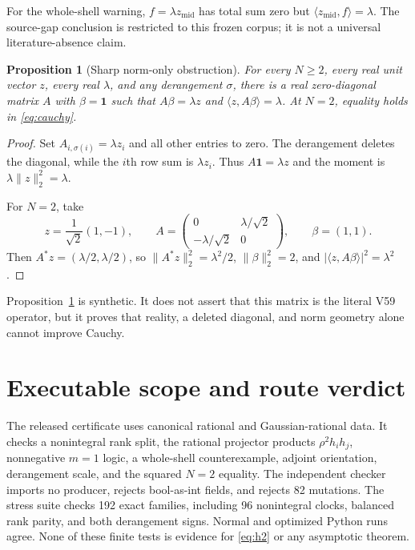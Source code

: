 \documentclass[10pt]{article}
\newtheorem{proposition}[theorem]{Proposition}
\newcommand{\one}{\mathbf 1}
\newcommand{\ip}[2]{\langle #1,#2\rangle}
\newcommand{\zm}{z_{\mathrm{mid}}}
\begin{document}
For the whole-shell warning, $f=\lambda\zm$ has total sum zero but
$\ip{\zm}f=\lambda$.  The source-gap conclusion is restricted to this frozen
corpus; it is not a universal literature-absence claim.

\begin{proposition}[Sharp norm-only obstruction]\label{prop:sharp}
For every $N\geq2$, every real unit vector $z$, every real $\lambda$, and any
derangement $\sigma$, there is a real zero-diagonal matrix $A$ with
$\beta=\one$ such that $A\beta=\lambda z$ and $\ip z{A\beta}=\lambda$.
At $N=2$, equality holds in \eqref{eq:cauchy}.
\end{proposition}

\begin{proof}
Set $A_{i,\sigma(i)}=\lambda z_i$ and all other entries to zero.  The
derangement deletes the diagonal, while the $i$th row sum is $\lambda z_i$.
Thus $A\one=\lambda z$ and the moment is $\lambda\|z\|_2^2=\lambda$.

For $N=2$, take
\[
 z=\frac1{\sqrt2}(1,-1),\qquad
 A=\begin{pmatrix}0&\lambda/\sqrt2\\-\lambda/\sqrt2&0\end{pmatrix},
 \qquad \beta=(1,1).
\]
Then $A^*z=(\lambda/2,\lambda/2)$, so
$\|A^*z\|_2^2=\lambda^2/2$, $\|\beta\|_2^2=2$, and
$|\ip z{A\beta}|^2=\lambda^2$.
\end{proof}

Proposition~\ref{prop:sharp} is synthetic.  It does not assert that this
matrix is the literal V59 operator, but it proves that reality, a deleted
diagonal, and norm geometry alone cannot improve Cauchy.

\section{Executable scope and route verdict}

The released certificate uses canonical rational and Gaussian-rational data.
It checks a nonintegral rank split, the rational projector products
$\rho^2h_ih_j$, nonnegative $m=1$ logic, a whole-shell counterexample,
adjoint orientation, derangement scale, and the squared $N=2$ equality.  The
independent checker imports no producer, rejects bool-as-int fields, and
rejects 82 mutations.  The stress suite checks 192 exact families, including
96 nonintegral clocks, balanced rank parity, and both derangement signs.
Normal and optimized Python runs agree.  None of these finite tests is
evidence for \eqref{eq:h2} or any asymptotic theorem.
\end{document}
